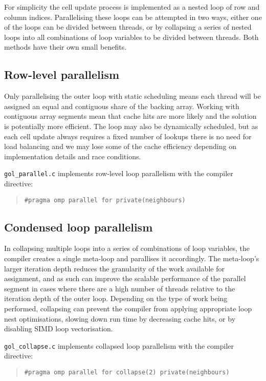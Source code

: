 \documentclass[]{article}
\begin{document}
For simplicity the cell update process is implemented as a nested loop of row and column indices. Parallelising these loops can be attempted in two ways, either one of the loops can be divided between threads, or by collapsing a series of nested loops into all combinations of loop variables to be divided between threads. Both methods have their own small benefits.

\subsection{Row-level parallelism}
Only parallelising the outer loop with static scheduling means each thread will be assigned an equal and contiguous share of the backing array. Working with contiguous array segments mean that cache hits are more likely and the solution is potentially more efficient. The loop may also be dynamically scheduled, but as each cell update always requires a fixed number of lookups there is no need for load balancing and we may lose some of the cache efficiency depending on implementation details and race conditions.

\texttt{gol\_parallel.c} implements row-level loop parallelism with the compiler directive:

\begin{quote}
\texttt{\#pragma omp parallel for private(neighbours)}
\end{quote}

\subsection{Condensed loop parallelism}
In collapsing multiple loops into a series of combinations of loop variables, the compiler creates a single meta-loop and parallises it accordingly. The meta-loop's larger iteration depth reduces the granularity of the work available for assignment, and as such can improve the scalable performance of the parallel segment in cases where there are a high number of threads relative to the iteration depth of the outer loop. Depending on the type of work being performed, collapsing can prevent the compiler from applying appropriate loop nest optimisations, slowing down run time by decreasing cache hits, or by disabling SIMD loop vectorisation.


\texttt{gol\_collapse.c} implements collapsed loop parallelism with the compiler directive:

\begin{quote}
\texttt{\#pragma omp parallel for collapse(2) private(neighbours)}
\end{quote}
\end{document}

